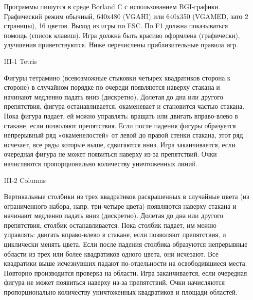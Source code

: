 
Программы пишутся в среде Borland C с использованием BGI-графики. Графический
режим обычный, 640х480 (VGAHI) или 640х350 (VGAMED, зато 2 страницы), 16
цветов. Выход из игры по ESC. По F1 должна показываться помощь (список
клавиш). Игра должна быть красиво оформлена (графически), улучшения
приветствуются. Ниже перечислены приблизительные правила игр.


III-1 Tetris

Фигуры тетрамино (всевозможные стыковки четырех квадратиков сторона к стороне)
в случайном порядке по очереди появляются наверху стакана и начинают медленно
падать вниз (дискретно). Долетая до дна или другого препятствия, фигура
останавливается, окаменевает и становится частью стакана. Пока фигура падает,
ей можно управлять: вращать или двигать вправо-влево в стакане, если позволяют
препятствия. Если после падения фигуры образуется непрерывный ряд
«окаменелостей» от левой до правой стенки стакана, этот ряд исчезает, все ряды
которые выше, сдвигаются вниз. Игра заканчивается, если очередная фигура не
может появиться наверху из-за препятствий. Очки начисляются пропорционально
количеству уничтоженных линий.


III-2 Columns

Вертикальные столбики из трех квадратиков раскрашенных в случайные цвета (из
ограниченного набора, напр. три-четыре цвета) появляются наверху стакана и
начинают медленно падать вниз (дискретно). Долетая до дна или другого
препятствия, столбик останавливается. Пока столбик падает, им можно управлять:
двигать вправо-влево в стакане, если позволяют препятствия, и циклически
менять цвета. Если после падения столбика образуются непрерывные области из
трех или более квадратиков одного цвета, они исчезают. Все квадратики выше
исчезнувших падают по-отдельности на освободившиеся места. Повторно
производится проверка на области. Игра заканчивается, если очередная фигура не
может появиться наверху из-за препятствий. Очки начисляются пропорционально
количеству уничтоженных квадратиков и площади областей.

